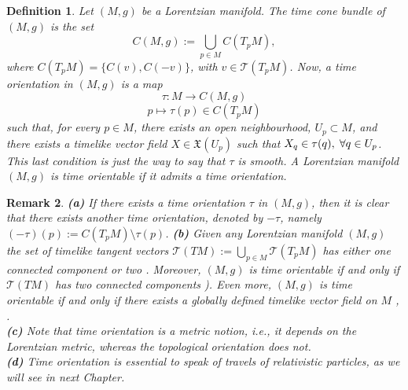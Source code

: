 \documentclass[11pt]{book}
\newtheorem{defi}{Definition}[chapter]
\newtheorem{rem}[defi]{Remark}
\def\T{\mathcal T}
\def\x{\mathfrak X}
\begin{document}
\begin{defi}
	Let $(M,g)$ be a Lorentzian manifold. The time cone bundle of $(M,g)$ is the set
	$$C(M,g):=\bigcup_{p\in M} C(T_pM),$$ where $C(T_pM)=\{C(v),C(-v)\}$, with $v\in \T(T_pM)$. Now, a time orientation in $(M,g)$ is a map 
	\[
	\tau:M\longrightarrow C(M,g)
	\]
	\[
	p\longmapsto \tau(p)\in C(T_pM)
	\]
	such that, for every $p\in M$, there exists an open neighbourhood, $U_p\subset M$, and there exists a timelike vector field $X\in \x(U_p)$ such that $X_q\in \tau(q),\hspace{1mm} \forall q \in U_p$. This last condition is just the way to say that $\tau$ is smooth. A Lorentzian manifold $(M,g)$ is time orientable if it admits a time orientation. 
\end{defi}

\begin{rem}
	{\rm
		{\bf (a)} If there exists a time orientation $\tau$ in $(M,g)$, then it is clear that there exists another time orientation, denoted by $-\tau$, namely $(-\tau)(p):=C(T_pM)\setminus \tau(p)$. {\bf (b)} Given any Lorentzian manifold $(M,g)$ the set of timelike tangent vectors $\T(TM):=\bigcup_{p\in M}\T(T_pM)$ has either one connected component or two \cite[Proposition 1.2.1]{SW}. Moreover, $(M,g)$ is time orientable if and only if $\T(TM)$ has two connected components \cite[Definition 1.2.2]{SW}). Even more, $(M,g)$ is time orientable if and only if there exists a globally defined timelike vector field on $M$ \cite[Lemma 5.32]{SRG}, \cite[Proposition 10]{SEC}. \\
		{\bf (c)} Note that time orientation is a metric notion, i.e., it depends on the Lorentzian metric, whereas the topological orientation does not. \\
		{\bf (d)} Time orientation is essential to speak of travels of relativistic particles, as we will see in next Chapter.  
	}
\end{rem}
\end{document}
